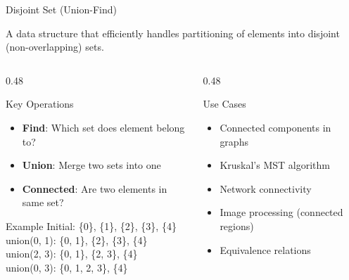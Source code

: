 \documentclass[aspectratio=169,xcolor=dvipsnames]{beamer}
\begin{document}
\begin{frame}{Disjoint Set (Union-Find)}
  \begin{definition}
    A data structure that efficiently handles partitioning of elements into disjoint (non-overlapping) sets.
  \end{definition}

  \vspace{0.3cm}

  \begin{columns}
    \begin{column}{0.48\textwidth}
      \begin{block}{Key Operations}
        \begin{itemize}
          \item \textbf{Find}: Which set does element belong to?
          \item \textbf{Union}: Merge two sets into one
          \item \textbf{Connected}: Are two elements in same set?
        \end{itemize}
      \end{block}

      \begin{exampleblock}{Example}
        Initial: \{0\}, \{1\}, \{2\}, \{3\}, \{4\} \\
        union(0, 1): \{0, 1\}, \{2\}, \{3\}, \{4\} \\
        union(2, 3): \{0, 1\}, \{2, 3\}, \{4\} \\
        union(0, 3): \{0, 1, 2, 3\}, \{4\}
      \end{exampleblock}
    \end{column}
    \begin{column}{0.48\textwidth}
      \begin{block}{Use Cases}
        \begin{itemize}
          \item Connected components in graphs
          \item Kruskal's MST algorithm
          \item Network connectivity
          \item Image processing (connected regions)
          \item Equivalence relations
        \end{itemize}
      \end{block}

    \end{column}
  \end{columns}
\end{frame}
\end{document}
